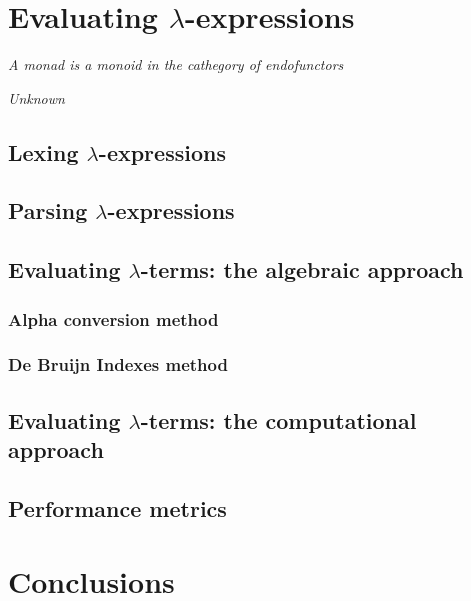 \documentclass{article}
\begin{document}
\section{Evaluating $\lambda$-expressions}

\epigraph{\textit{A monad is a monoid in the cathegory of endofunctors}}{\textit{Unknown}}

\subsection{Lexing $\lambda$-expressions}

\subsection{Parsing $\lambda$-expressions}

\subsection{Evaluating $\lambda$-terms: the algebraic approach}

\subsubsection{Alpha conversion method}

\subsubsection{De Bruijn Indexes method}

\subsection{Evaluating $\lambda$-terms: the computational approach}

\subsection{Performance metrics}

\section{Conclusions}



\clearpage
\end{document}
